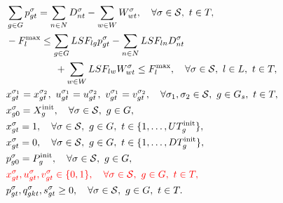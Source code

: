 \begin{subequations}
\begin{align}
	& \sum_{g\in G} p_{gt}^\sigma = \sum_{n\in N} D_{nt}^\sigma - \sum_{w\in W} W_{wt}^\sigma, \quad \forall \sigma \in \mathcal{S},\ t\in T,\ \label{eq:suc:cons12} \\
	& -F^\text{max}_l \leq \sum_{g\in G} LSF_{lg} p_{gt}^\sigma - \sum_{n\in N} LSF_{ln} D_{nt}^\sigma \notag \\
	&\quad\quad\quad\quad\quad + \sum_{w\in W} LSF_{lw} W_{wt}^\sigma \leq F^\text{max}_l,\quad \forall \sigma \in \mathcal{S},\ l\in L,\ t\in T, \label{eq:suc:cons13} \\
	& x_{gt}^{\sigma_1} = x_{gt}^{\sigma_2},\ u_{gt}^{\sigma_1} = u_{gt}^{\sigma_2},\ v_{gt}^{\sigma_1} = v_{gt}^{\sigma_2},\quad \forall \sigma_1,\sigma_2 \in \mathcal{S},\ g\in G_s,\ t\in T, \label{eq:suc:cons14} \\
	& x_{g0}^\sigma = X^\text{init}_g, \quad \forall \sigma \in \mathcal{S},\ g\in G, \label{eq:suc:cons15} \\
	& x_{gt}^\sigma = 1, \quad \forall \sigma \in \mathcal{S},\ g\in G,\ t\in \{1, \dots, UT^\text{init}_g\}, \label{eq:suc:cons16} \\
	& x_{gt}^\sigma = 0, \quad \forall \sigma \in \mathcal{S},\ g\in G,\ t\in \{1, \dots, DT^\text{init}_g\}, \label{eq:suc:cons17} \\
	& p_{g0}^\sigma = P^\text{init}_g, \quad \forall \sigma \in \mathcal{S},\ g\in G,\ \label{eq:suc:cons18} \\
	& \textcolor{red}{x_{gt}^\sigma , u_{gt}^\sigma , v_{gt}^\sigma \in \{0,1\},\quad \forall \sigma \in \mathcal{S},\ g\in G,\ t\in T, }\label{eq:suc:cons19} \\
	& p_{gt}^\sigma , q_{gkt}^\sigma,s_{gt}^\sigma \geq 0, \quad \forall \sigma \in \mathcal{S},\ g\in G,\ t\in T. \label{eq:suc:cons20} 
	\end{align}
\end{subequations}

